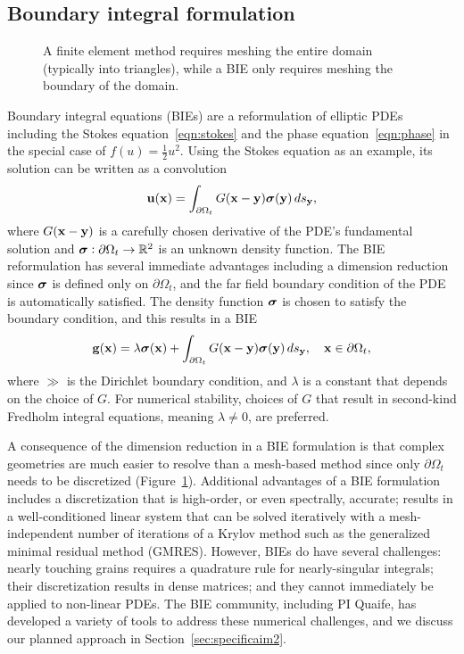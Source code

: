 \subsection{Boundary integral formulation}
\label{sec:bie}

\begin{figure}
  \caption{\label{fig:fem_vs_bie} \footnotesize A finite element method
  requires meshing the entire domain (typically into triangles), while a
  BIE only requires meshing the boundary of the domain.}
\end{figure}
Boundary integral equations (BIEs) are a reformulation of elliptic PDEs
including the Stokes equation~\eqref{eqn:stokes} and the phase
equation~\eqref{eqn:phase} in the special case of $f(u) =
\tfrac{1}{2}u^2$. Using the Stokes equation as an example, its solution
can be written as a convolution 
\begin{align*}
  \mathbf{u}(\mathbf{x}) = \int_{\partial\Omega_t} G(\mathbf{x} - \mathbf{y}) \boldsymbol{\sigma}(\mathbf{y}) \, ds_{\mathbf{y}},
\end{align*}
where $G(\mathbf{x} - \mathbf{y})$ is a carefully chosen derivative of the PDE's
fundamental solution and $\boldsymbol{\sigma}: \partial \Omega_t \rightarrow \mathbb{R}^2$
is an unknown density function. The BIE reformulation has several
immediate advantages including a dimension reduction since $\boldsymbol{\sigma}$ is
defined only on $\partial \Omega_t$, and the far field boundary
condition of the PDE is automatically satisfied. The density
function $\boldsymbol{\sigma}$ is chosen to satisfy the boundary condition, and this
results in a BIE 
\begin{align*}
  \mathbf{g}(\mathbf{x}) = \lambda \boldsymbol{\sigma}(\mathbf{x}) + 
    \int_{\partial\Omega_t} G(\mathbf{x} - \mathbf{y}) \boldsymbol{\sigma}(\mathbf{y}) \, ds_{\mathbf{y}},
    \quad \mathbf{x} \in \partial\Omega_t,
\end{align*}
where $\gg$ is the Dirichlet boundary condition, and $\lambda$ is a
constant that depends on the choice of $G$. For numerical stability,
choices of $G$ that result in second-kind Fredholm integral equations,
meaning $\lambda \neq 0$, are preferred.

A consequence of the dimension reduction in a BIE formulation is that
complex geometries are much easier to resolve than a mesh-based method
since only $\partial \Omega_t$ needs to be discretized
(Figure~\ref{fig:fem_vs_bie}). Additional advantages of a BIE
formulation includes a discretization that is high-order, or even
spectrally, accurate; results in a well-conditioned linear system that
can be solved iteratively with a mesh-independent number of iterations
of a Krylov method such as the generalized minimal residual method
(GMRES). However, BIEs do have several challenges: nearly touching
grains requires a quadrature rule for nearly-singular integrals; their
discretization results in dense matrices; and they cannot immediately be
applied to non-linear PDEs. The BIE community, including PI Quaife, has
developed a variety of tools to address these numerical challenges, and
we discuss our planned approach in Section~\ref{sec:specificaim2}.

